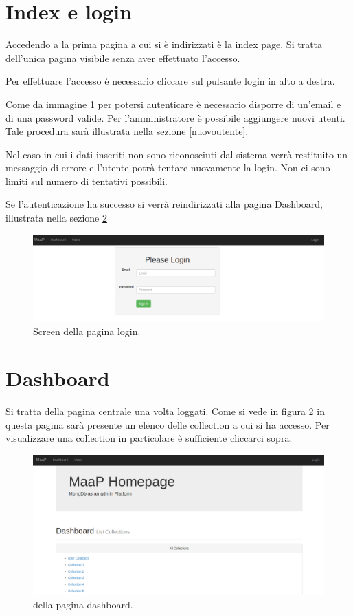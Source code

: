 \section{Index e login}

Accedendo a \ProjectName{} la prima pagina a cui si è indirizzati è la index page.
Si tratta dell'unica pagina visibile senza aver effettuato l'accesso.

Per effettuare l'accesso è necessario cliccare sul pulsante login in alto a destra.

Come da immagine \ref{loginfig} per potersi autenticare è necessario disporre di un'email e di una password valide.
Per l'amministratore è possibile aggiungere nuovi utenti. Tale procedura sarà illustrata nella sezione \ref{nuovoutente}.

Nel caso in cui i dati inseriti non sono riconosciuti dal sistema verrà restituito un messaggio di errore e l'utente potrà tentare nuovamente la login. Non ci sono limiti sul numero di tentativi possibili.

Se l'autenticazione ha successo si verrà reindirizzati alla pagina Dashboard, illustrata nella sezione \ref{dashboard}
\begin{figure}[h]
	\label{loginfig}
	\centering \includegraphics[width=1\textwidth]{login.png}
	\caption{Screen della pagina login.}
\end{figure}

\section{Dashboard}
 \label{dashboard}
 
Si tratta della pagina centrale una volta loggati. Come si vede in figura \ref{dashboardfig} in questa pagina sarà presente un elenco delle collection a cui si ha accesso. Per visualizzare una collection in particolare è sufficiente cliccarci sopra.

\begin{figure}[h]
	\label{dashboardfig}
	\centering \includegraphics[width=1\textwidth]{dashboard.png}
	\caption{della pagina dashboard. }
\end{figure}

